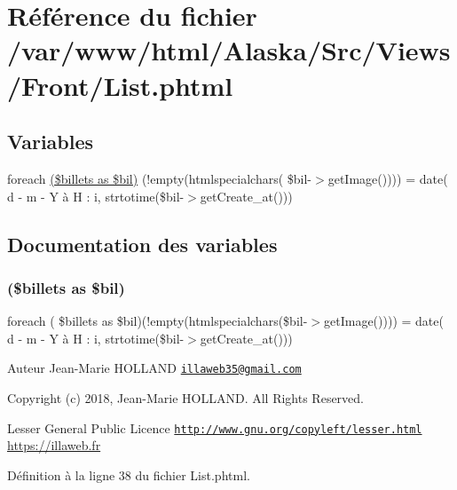 \hypertarget{_front_2_list_8phtml}{}\section{Référence du fichier /var/www/html/\+Alaska/\+Src/\+Views/\+Front/\+List.phtml}
\label{_front_2_list_8phtml}
\subsection*{Variables}
\begin{DoxyCompactItemize}
\item 
foreach \hyperlink{_front_2_list_8phtml_a6adf298dcf6cb192f46b9acd637b5fb8}{(\$billets as \$bil)} (!empty(htmlspecialchars( \$bil-\/$>$get\+Image()))) = date(\textquotesingle{} d -\/ m -\/ Y à H \+: i\textquotesingle{}, strtotime(\$bil-\/$>$get\+Create\+\_\+at()))
\end{DoxyCompactItemize}


\subsection{Documentation des variables}
\mbox{\label{_front_2_list_8phtml_a6adf298dcf6cb192f46b9acd637b5fb8}} 
\subsubsection{\texorpdfstring{(\$billets as \$bil)}{($billets as $bil)}}
{\footnotesize\ttfamily foreach ( \$billets as \$bil)(!empty(htmlspecialchars(\$bil-\/$>$get\+Image()))) = date(\textquotesingle{} d -\/ m -\/ Y à H \+: i\textquotesingle{}, strtotime(\$bil-\/$>$get\+Create\+\_\+at()))}

\begin{DoxyAuthor}{Auteur}
Jean-\/\+Marie H\+O\+L\+L\+A\+ND \href{mailto:illaweb35@gmail.com}{\tt illaweb35@gmail.\+com} 
\end{DoxyAuthor}
\begin{DoxyCopyright}{Copyright}
(c) 2018, Jean-\/\+Marie H\+O\+L\+L\+A\+ND. All Rights Reserved.
\end{DoxyCopyright}
Lesser General Public Licence \href{http://www.gnu.org/copyleft/lesser.html}{\tt http\+://www.\+gnu.\+org/copyleft/lesser.\+html} \hyperlink{}{https\+://illaweb.\+fr}

Définition à la ligne 38 du fichier List.\+phtml.

